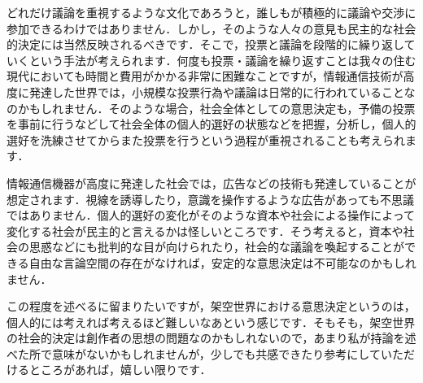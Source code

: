 どれだけ議論を重視するような文化であろうと，誰しもが積極的に議論や交渉に参加できるわけではありません．しかし，そのような人々の意見も民主的な社会的決定には当然反映されるべきです．そこで，投票と議論を段階的に繰り返していくという手法が考えられます．何度も投票・議論を繰り返すことは我々の住む現代においても時間と費用がかかる非常に困難なことですが，情報通信技術が高度に発達した世界では，小規模な投票行為や議論は日常的に行われていることなのかもしれません．そのような場合，社会全体としての意思決定も，予備の投票を事前に行うなどして社会全体の個人的選好の状態などを把握，分析し，個人的選好を洗練させてからまた投票を行うという過程が重視されることも考えられます．

情報通信機器が高度に発達した社会では，広告などの技術も発達していることが想定されます．視線を誘導したり，意識を操作するような広告があっても不思議ではありません．個人的選好の変化がそのような資本や社会による操作によって変化する社会が民主的と言えるかは怪しいところです．そう考えると，資本や社会の思惑などにも批判的な目が向けられたり，社会的な議論を喚起することができる自由な言論空間の存在がなければ，安定的な意思決定は不可能なのかもしれません．

この程度を述べるに留まりたいですが，架空世界における意思決定というのは，個人的には考えれば考えるほど難しいなあという感じです．そもそも，架空世界の社会的決定は創作者の思想の問題なのかもしれないので，あまり私が持論を述べた所で意味がないかもしれませんが，少しでも共感できたり参考にしていただけるところがあれば，嬉しい限りです．

